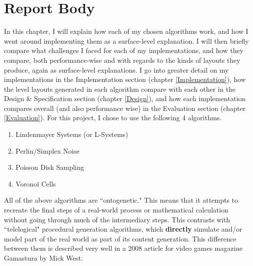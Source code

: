 \chapter{Report Body} \label{Body}

In this chapter, I will explain how each of my chosen algorithms work, and how I went around implementing them as a surface-level explanation. I will then briefly compare what challenges I faced for each of my implementations, and how they compare, both performance-wise and with regards to the kinds of layouts they produce, again as surface-level explanations. I go into greater detail on my implementations in the Implementation section (chapter \ref{Implementation}), how the level layouts generated in each algorithm compare with each other in the Design \& Specification section (chapter \ref{Design}), and how each implementation compares overall (and also performance wise) in the Evaluation section (chapter \ref{Evaluation}). For this project, I chose to use the following 4 algorithms.

\begin{enumerate}
    \item Lindenmayer Systems (or L-Systems)
    \item Perlin/Simplex Noise
    \item Poisson Disk Sampling
    \item Voronoï Cells
\end{enumerate}

All of the above algorithms are ``ontogenetic." This means that it attempts to recreate the final steps of a real-world process or mathematical calculation without going through much of the intermediary steps.\cite{pcgwikionto} This contrasts with ``telelogical" procedural generation algorithms, which \textbf{directly} simulate and/or model part of the real world as part of its content generation.\cite{pcgwikitele} This difference between them is described very well in a 2008 article for video games magazine Gamastura by Mick West:

